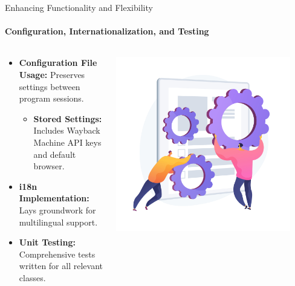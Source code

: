 \documentclass[
ngerman,%
authorontitle=true,
]{bfhbeamer}
\begin{document}
	\begin{frame}{Enhancing Functionality and Flexibility}
		\framesubtitle{Configuration, Internationalization, and Testing}
		\begin{columns} %
			\begin{column}{0.6\textwidth} %
				\begin{itemize}
					\item \textbf{Configuration File Usage:} Preserves settings between program sessions.
					\begin{itemize}
						\item \textbf{Stored Settings:} Includes Wayback Machine API keys and default browser.
					\end{itemize}
					\item \textbf{i18n Implementation:} Lays groundwork for multilingual support.
					\item \textbf{Unit Testing:} Comprehensive tests written for all relevant classes.
				\end{itemize}
			\end{column}
			\begin{column}{0.4\textwidth} %
				\begin{center}
					\includegraphics[width=0.9\textwidth]{pictures/final_presentation/functionality.jpg}
				\end{center}
			\end{column}
		\end{columns} %
	\end{frame}
	
\end{document}

